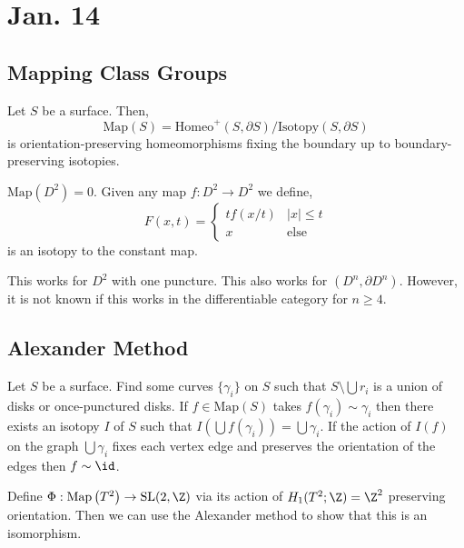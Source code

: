 \documentclass[12pt]{extarticle}
\begin{document}
\section{Jan. 14}

\subsection{Mapping Class Groups}

\newcommand{\Map}[1]{\mathrm{Map}\left( #1 \right)}

\begin{defn}
Let $S$ be a surface. Then,
\[ \Map{S} = \mathrm{Homeo}^+(S, \partial S) / \mathrm{Isotopy}(S, \partial S) \]
is orientation-preserving homeomorphisms fixing the boundary up to boundary-preserving isotopies. 
\end{defn}

\begin{example}
$\Map{D^2} = 0$. Given any map $f : D^2 \to D^2$ we define,
\[ F(x, t) = 
\begin{cases}
t f(x/t) & |x| \le t
\\
x & \text{else}
\end{cases} \]
is an isotopy to the constant map. 
\end{example}

\begin{rmk}
This works for $D^2$ with one puncture. This also works for $(D^n, \partial D^n)$. However, it is not known if this works in the differentiable category for $n \ge 4$. 
\end{rmk}

\subsection{Alexander Method}

Let $S$ be a surface. Find some curves $\{ \gamma_i \}$ on $S$ such that $S \setminus \bigcup r_i$ is a union of disks or once-punctured disks. If $f \in \Map{S}$ takes $f(\gamma_i) \sim \gamma_i$ then there exists an isotopy $I$ of $S$ such that $I(\bigcup f(\gamma_i)) = \bigcup \gamma_i$. If the action of $I(f)$ on the graph $\bigcup \gamma_i$ fixes each vertex edge and preserves the orientation of the edges then $f \sim \id$.

\newcommand{\SL}{\mathrm{SL}}

\begin{example}
Define $\Phi : \Map{T^2} \to \SL(2,\Z)$ via its action of $H_1(T^2 ; \Z) = \Z^2$ preserving orientation. Then we can use the Alexander method to show that this is an isomorphism. 
\end{example}
\end{document}
